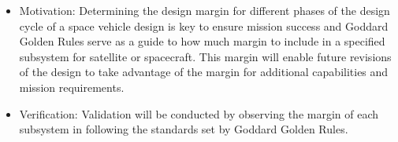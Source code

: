 \begin{enumerate}
\begin{enumerate}
\begin{enumerate}
                        \begin{itemize}
                            \item Motivation: Determining the design margin for different phases of the design cycle of a space vehicle design is key to ensure mission success and Goddard Golden Rules serve as a guide to how much margin to include in a specified subsystem for satellite or spacecraft. This margin will enable future revisions of the design to take advantage of the margin for additional capabilities and mission requirements. 
                            \item Verification: Validation will be conducted by observing the margin of each subsystem in following the standards set by Goddard Golden Rules.   \end{itemize}
                \end{enumerate}
        \end{enumerate}
\end{enumerate}
